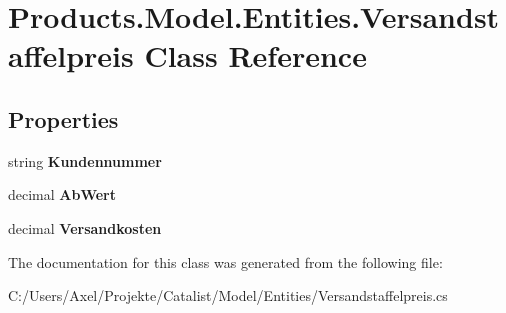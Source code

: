 \hypertarget{class_products_1_1_model_1_1_entities_1_1_versandstaffelpreis}{}\section{Products.\+Model.\+Entities.\+Versandstaffelpreis Class Reference}
\label{class_products_1_1_model_1_1_entities_1_1_versandstaffelpreis}
\subsection*{Properties}
\begin{DoxyCompactItemize}
\item 
string {\bfseries Kundennummer}\hypertarget{class_products_1_1_model_1_1_entities_1_1_versandstaffelpreis_a947442f6ae16b7f42e01a3b9d3a8ec01}{}\label{class_products_1_1_model_1_1_entities_1_1_versandstaffelpreis_a947442f6ae16b7f42e01a3b9d3a8ec01}

\item 
decimal {\bfseries Ab\+Wert}\hypertarget{class_products_1_1_model_1_1_entities_1_1_versandstaffelpreis_a0624ae010819d099d9f141ea18d423f9}{}\label{class_products_1_1_model_1_1_entities_1_1_versandstaffelpreis_a0624ae010819d099d9f141ea18d423f9}

\item 
decimal {\bfseries Versandkosten}\hypertarget{class_products_1_1_model_1_1_entities_1_1_versandstaffelpreis_afcfd6adc9325cf462b6b1d22ea064dba}{}\label{class_products_1_1_model_1_1_entities_1_1_versandstaffelpreis_afcfd6adc9325cf462b6b1d22ea064dba}

\end{DoxyCompactItemize}


The documentation for this class was generated from the following file\+:\begin{DoxyCompactItemize}
\item 
C\+:/\+Users/\+Axel/\+Projekte/\+Catalist/\+Model/\+Entities/Versandstaffelpreis.\+cs\end{DoxyCompactItemize}
